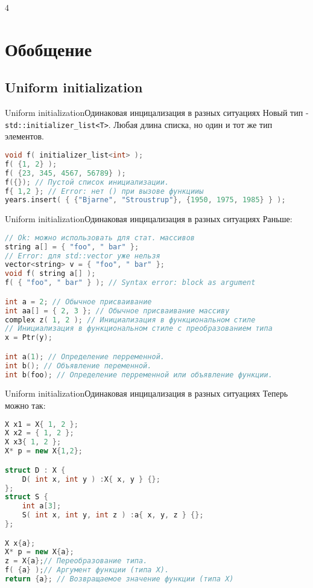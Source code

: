 4\documentclass[10pt]{beamer}
\begin{document}
\section{Обобщение}
\subsection{Uniform initialization}
\hypertarget{Uniform initialization}{}
\begin{frame}[fragile]{Uniform initialization}{Одинаковая инцицализация в разных ситуациях}
Новый тип - \texttt{std::initializer\_list<T>}. Любая длина списка, но один и тот же тип элементов.
\begin{lstlisting}[language=C++]
void f( initializer_list<int> );
f( {1, 2} );
f( {23, 345, 4567, 56789} );
f({}); // Пустой список инициализации.
f{ 1,2 }; // Error: нет () при вызове функцииы
years.insert( { {"Bjarne", "Stroustrup"}, {1950, 1975, 1985} } );
\end{lstlisting}
\end{frame}

\begin{frame}[fragile]{Uniform initialization}{Одинаковая инцицализация в разных ситуациях}
Раньше:
\begin{lstlisting}[language=C++]
// Ok: можно использовать для стат. массивов
string a[] = { "foo", " bar" }; 
// Error: для std::vector уже нельзя
vector<string> v = { "foo", " bar" }; 
void f( string a[] );
f( { "foo", " bar" } ); // Syntax error: block as argument

int a = 2; // Обычное присваивание
int aa[] = { 2, 3 }; // Обычное присваивание массиву
complex z( 1, 2 ); // Инициализация в функциональном стиле
// Инициализация в функциональном стиле с преобразованием типа
x = Ptr(y); 

int a(1); // Определение перременной.
int b(); // Объявление переменной.
int b(foo); // Определение перременной или объявление функции.
\end{lstlisting}
\end{frame}

\begin{frame}[fragile]{Uniform initialization}{Одинаковая инцицализация в разных ситуациях}
Теперь можно так:
\begin{lstlisting}[language=C++]
X x1 = X{ 1, 2 }; 
X x2 = { 1, 2 };
X x3{ 1, 2 }; 
X* p = new X{1,2}; 

struct D : X {
    D( int x, int y ) :X{ x, y } {};
};
struct S {
    int a[3];
    S( int x, int y, int z ) :a{ x, y, z } {};
};

X x{a}; 
X* p = new X{a};
z = X{a};// Переобразование типа.
f( {a} );// Аргумент функции (типа X).
return {a}; // Возвращаемое значение функции (типа X)
\end{lstlisting}
\end{frame}
\end{document}
